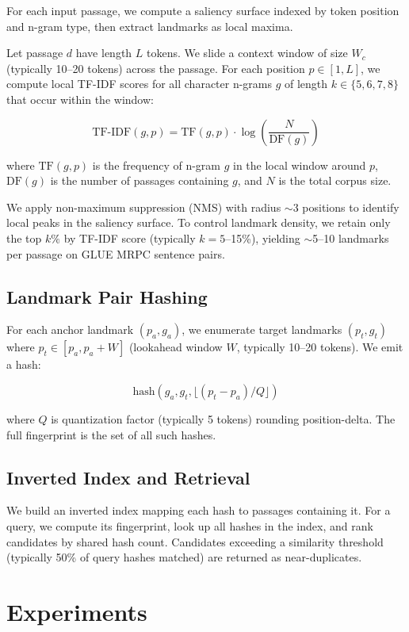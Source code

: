 \documentclass[11pt,letterpaper]{article}
\begin{document}
For each input passage, we compute a saliency surface indexed by token position and n-gram type, then extract landmarks as local maxima.

Let passage $d$ have length $L$ tokens. We slide a context window of size $W_c$ (typically 10--20 tokens) across the passage. For each position $p \in [1, L]$, we compute local TF-IDF scores for all character n-grams $g$ of length $k \in \{5, 6, 7, 8\}$ that occur within the window:

$$\text{TF-IDF}(g, p) = \text{TF}(g, p) \cdot \log\left(\frac{N}{\text{DF}(g)}\right)$$

where $\text{TF}(g, p)$ is the frequency of n-gram $g$ in the local window around $p$, $\text{DF}(g)$ is the number of passages containing $g$, and $N$ is the total corpus size.

We apply non-maximum suppression (NMS) with radius $\sim$3 positions to identify local peaks in the saliency surface. To control landmark density, we retain only the top $k\%$ by TF-IDF score (typically $k=5$--15\%), yielding $\sim$5--10 landmarks per passage on GLUE MRPC sentence pairs.

\subsection{Landmark Pair Hashing}

For each anchor landmark $(p_a, g_a)$, we enumerate target landmarks $(p_t, g_t)$ where $p_t \in [p_a, p_a + W]$ (lookahead window $W$, typically 10--20 tokens). We emit a hash:

$$\text{hash}(g_a, g_t, \lfloor (p_t - p_a) / Q \rfloor)$$

where $Q$ is quantization factor (typically 5 tokens) rounding position-delta. The full fingerprint is the set of all such hashes.

\subsection{Inverted Index and Retrieval}

We build an inverted index mapping each hash to passages containing it. For a query, we compute its fingerprint, look up all hashes in the index, and rank candidates by shared hash count. Candidates exceeding a similarity threshold (typically 50\% of query hashes matched) are returned as near-duplicates.

\section{Experiments}
\end{document}
